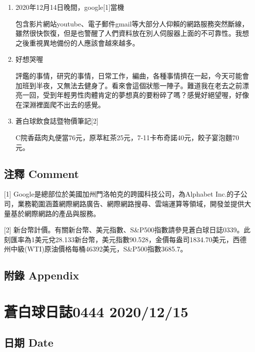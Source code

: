 \documentclass[a5paper, 10pt
]{book}
\begin{document}
\begin{enumerate}
\def\labelenumi{\arabic{enumi}.}
\item
  2020年12月14日晚間，google{[}1{]}當機

  包含影片網站youtube、電子郵件gmail等大部分人仰賴的網路服務突然斷線，雖然很快恢復，但是也警醒了人們資料放在別人伺服器上面的不可靠性。我想之後重視異地備份的人應該會越來越多。
\item
  好想哭喔

  評鑑的事情，研究的事情，日常工作，編曲，各種事情擠在一起，今天可能會加班到半夜，又無法去健身了。看來會這個狀態一陣子。難道我在老去之前漂亮一回，受到年輕男性肉體肯定的夢想真的要粉碎了嗎？感覺好絕望喔，好像在深淵裡面爬不出去的感覺。
\item
  蒼白球飲食誌暨物價筆記{[}2{]}

  C院香菇肉丸便當76元，原萃紅茶25元，7-11卡布奇諾40元，餃子宴泡麵70元。
\end{enumerate}

\hypertarget{ux6ce8ux91cb-comment-13}{%
\subsection{注釋 Comment}\label{ux6ce8ux91cb-comment-13}}

{[}1{]} Google是總部位於美國加州門洛帕克的跨國科技公司，為Alphabet
Inc.的子公司，業務範圍涵蓋網際網路廣告、網際網路搜尋、雲端運算等領域，開發並提供大量基於網際網路的產品與服務。

{[}2{]}
新台幣計價。有關新台幣、美元指數、S\&P500指數請參見蒼白球日誌0339。此刻匯率為1美元兌28.133新台幣，美元指數90.528，金價每盎司1834.70美元，西德州中級(WTI)原油價格每桶46392美元，S\&P500指數3685.7。

\hypertarget{ux9644ux9304-appendix-13}{%
\subsection{附錄 Appendix}\label{ux9644ux9304-appendix-13}}

\hypertarget{ux84bcux767dux7403ux65e5ux8a8c0444-20201215}{%
\section{蒼白球日誌0444
2020/12/15}\label{ux84bcux767dux7403ux65e5ux8a8c0444-20201215}}

\hypertarget{ux65e5ux671f-date-14}{%
\subsection{日期 Date}\label{ux65e5ux671f-date-14}}
\end{document}
